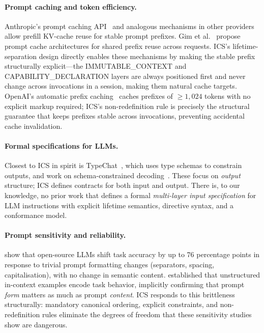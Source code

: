 \documentclass[11pt]{article}
\begin{document}
\paragraph{Prompt caching and token efficiency.}
Anthropic's prompt caching API~\citep{anthropic2024caching} and analogous
mechanisms in other providers allow prefill KV-cache reuse for stable prompt
prefixes. Gim et al.~\citep{gim2023prompt} propose prompt cache architectures
for shared prefix reuse across requests. ICS's lifetime-separation design
directly enables these mechanisms by making the stable prefix structurally
explicit---the IMMUTABLE\_CONTEXT and CAPABILITY\_DECLARATION layers are
always positioned first and never change across invocations in a session,
making them natural cache targets. OpenAI's automatic prefix caching~\citep{openai2024caching}
caches prefixes of $\geq 1{,}024$ tokens with no explicit markup required;
ICS's non-redefinition rule is precisely the structural guarantee that keeps
prefixes stable across invocations, preventing accidental cache invalidation.

\paragraph{Formal specifications for LLMs.}
Closest to ICS in spirit is TypeChat~\citep{typechat2023}, which uses type
schemas to constrain outputs, and work on schema-constrained
decoding~\citep{willard2023efficient,geng2023grammar}. These focus on
\emph{output} structure; ICS defines contracts for both input and output.
There is, to our knowledge, no prior work that defines a formal
\emph{multi-layer input specification} for LLM instructions with explicit
lifetime semantics, directive syntax, and a conformance model.

\paragraph{Prompt sensitivity and reliability.}
\citet{sclar2024sensitivity} show that open-source LLMs shift task accuracy
by up to 76 percentage points in response to trivial prompt formatting changes
(separators, spacing, capitalisation), with no change in semantic content.
\citet{brown2020gpt3} established that unstructured in-context examples encode
task behavior, implicitly confirming that prompt \emph{form} matters as much as
prompt \emph{content}. ICS responds to this brittleness structurally: mandatory
canonical ordering, explicit constraints, and non-redefinition rules eliminate
the degrees of freedom that these sensitivity studies show are dangerous.
\end{document}
